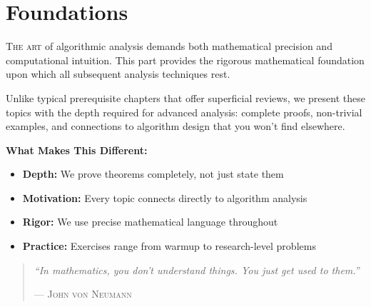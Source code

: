 \part{Foundations}
\label{part:foundations}

\begin{partintro}
	\lettrine[lines=3]{T}{he art} of algorithmic analysis demands both mathematical 
	precision and computational intuition. This part provides the rigorous 
	mathematical foundation upon which all subsequent analysis techniques rest.

	Unlike typical prerequisite chapters that offer superficial reviews, we present 
	these topics with the depth required for advanced analysis: complete proofs, 
	non-trivial examples, and connections to algorithm design that you won't find 
	elsewhere.

	\vspace{1em}
	\textbf{What Makes This Different:}
	\begin{itemize}[noitemsep]
		\item \textbf{Depth:} We prove theorems completely, not just state them
		\item \textbf{Motivation:} Every topic connects directly to algorithm analysis
		\item \textbf{Rigor:} We use precise mathematical language throughout
		\item \textbf{Practice:} Exercises range from warmup to research-level problems
	\end{itemize}
	\begin{quote}
	\textit{``In mathematics, you don't understand things. You just get used to them.''}

	\hfill--- \textsc{John von Neumann}
	\end{quote}

\end{partintro}


